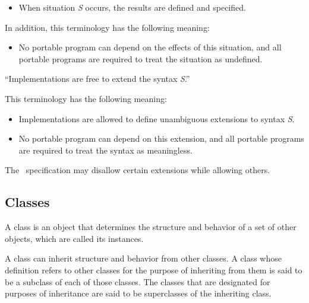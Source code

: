 \begin{flushdesc}
\begin{itemize}
\item  When situation \emph{S} occurs, the results are defined and
specified.

\end{itemize}

\noindent
In addition, this terminology has the following meaning:

\begin{itemize}

\item  No portable program can depend on the effects of this
situation, and all portable programs are required to treat the situation
as undefined.

\end{itemize}

\item[``Implementations are free to extend the syntax \emph{S}.'']

This terminology has the following meaning:

\begin{itemize}

\item  Implementations are allowed to define unambiguous extensions
to syntax \emph{S}.

\item  No portable program can depend on this extension, and
all portable programs are required to treat the syntax
as meaningless.

\end{itemize}
\end{flushdesc}

The \CLOS\ specification may disallow certain extensions while allowing others.


\subsection{Classes}
\label{Classes-SECTION}

A {\bit class\/} is an object that determines the structure and behavior 
of a set of other objects, which are called its {\bit instances}.   

A class can inherit structure and behavior from other classes.  
A class whose definition refers to other classes for the purpose of
inheriting from them is said to be a {\bit subclass\/} of each of
those classes.  The classes that are designated for purposes of
inheritance are said to be {\bit superclasses\/}
of the inheriting class.


